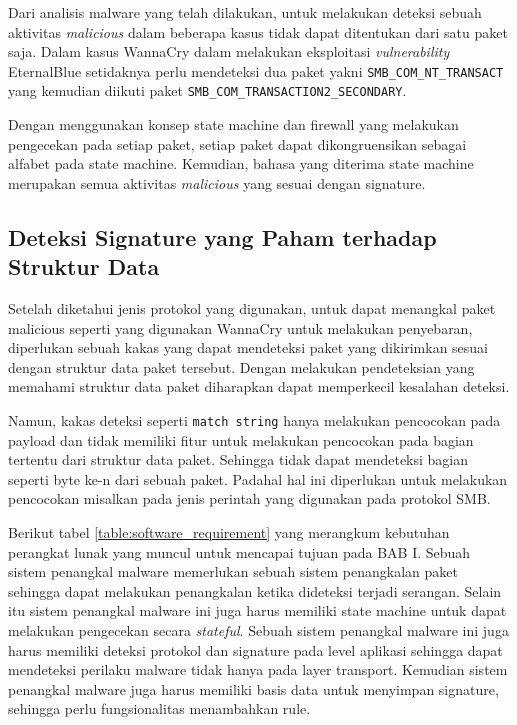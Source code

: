 Dari analisis malware yang telah dilakukan, untuk melakukan deteksi sebuah aktivitas \textit{malicious} dalam beberapa kasus tidak dapat ditentukan dari satu paket saja. Dalam kasus WannaCry dalam melakukan eksploitasi \textit{vulnerability} EternalBlue setidaknya perlu mendeteksi dua paket yakni \verb|SMB_COM_NT_TRANSACT| yang kemudian diikuti paket \verb|SMB_COM_TRANSACTION2_SECONDARY|.

Dengan menggunakan konsep state machine dan firewall yang melakukan pengecekan pada setiap paket, setiap paket dapat dikongruensikan sebagai alfabet pada state machine. Kemudian, bahasa yang diterima state machine merupakan semua aktivitas \textit{malicious} yang sesuai dengan signature.

\subsection{Deteksi Signature yang Paham terhadap Struktur Data}

Setelah diketahui jenis protokol yang digunakan, untuk dapat menangkal paket malicious seperti yang digunakan WannaCry untuk melakukan penyebaran, diperlukan sebuah kakas yang dapat mendeteksi paket yang dikirimkan sesuai dengan struktur data paket tersebut. Dengan melakukan pendeteksian yang memahami struktur data paket diharapkan dapat memperkecil kesalahan deteksi.

Namun, kakas deteksi seperti \verb|match string| hanya melakukan pencocokan pada payload dan tidak memiliki fitur untuk melakukan pencocokan pada bagian tertentu dari struktur data paket. Sehingga tidak dapat mendeteksi bagian seperti byte ke-n dari sebuah paket. Padahal hal ini diperlukan untuk melakukan pencocokan misalkan pada jenis perintah yang digunakan pada protokol SMB.

Berikut tabel \ref{table:software_requirement} yang merangkum kebutuhan perangkat lunak yang muncul untuk mencapai tujuan pada BAB I. Sebuah sistem penangkal malware memerlukan sebuah sistem penangkalan paket sehingga dapat melakukan penangkalan ketika dideteksi terjadi serangan. Selain itu sistem penangkal malware ini juga harus memiliki state machine untuk dapat melakukan pengecekan secara \textit{stateful}. Sebuah sistem penangkal malware ini juga harus memiliki deteksi protokol dan signature pada level aplikasi sehingga dapat mendeteksi perilaku malware tidak hanya pada layer transport. Kemudian sistem penangkal malware juga harus memiliki basis data untuk menyimpan signature, sehingga perlu fungsionalitas menambahkan rule.

